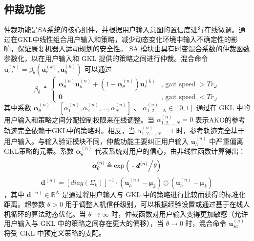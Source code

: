    \subsection{仲裁功能  }    仲裁功能是SA系统的核心组件，并根据用户输入意图的置信度进行在线微调。通过在GKL中线性组合用户输入和策略，减少动态变化环境中输入不确定性的影响，保证康复机器人运动规划的安全性。 SA 模块由具有时变混合系数的仲裁函数参数化，以在用户输入和 GKL 提供的策略之间进行仲裁。混合命令    ${\pmb{u}}_{sa}^{(n)} = {\beta _\theta }({\pmb{u}}_r^{(k)},{\pmb{u}}_h^{(n)})$    可以通过
    \begin{equation}
  \label{deqn_ex15}
  {\beta _\theta } \triangleq \left \{  {\begin{array}{*{20}{c}}
    {\pmb{\alpha }_\theta ^{(n)}{\pmb{u}}_h^{(n)} + \left( {1 - {\boldsymbol{\alpha }}_\theta ^{(n)}} \right){\pmb{u}}_r^{(k)}}&{{\text{, gait speed }}\pmb{ >  }T{r_\omega }}  \\  
    \pmb{0}&{{\text{, gait speed }}\pmb{ <  }T{r_\omega }} 
  \end{array}} \right.
\end{equation}    其中系数    ${\pmb{\alpha }}_\theta ^{(n)} = [\alpha _1^{(n)},\alpha _2^{(n)},...,\alpha _N^{(n)}]$    、    $\alpha _{1,2,...,N}^{(n)} \in [0,1]$    通过在 GKL 中的用户输入和策略之间分配控制权限来在线调整。当   $\alpha _{1,2,...,N}^{(n)} = 0$   表示AKO的参考轨迹完全依赖于GKL中的策略时。相反，当    $\alpha _{1,2,...,N}^{(n)} = 1$    时，参考轨迹完全基于用户输入。与输入验证模块不同，仲裁功能主要纠正用户输入   ${\pmb{u}}_h^{(n)}$   中严重偏离GKL策略的元素。系数    ${\pmb{\alpha }}_\theta ^{(n)}$    代表系统对用户的信心，由非线性函数计算得出：
    \begin{equation}
  \label{deqn_ex16}
  {\pmb{\alpha }}_\theta ^{(n)} \triangleq {\text{exp}}\left( {{\text{ - }}{{{\pmb{d}^{(n)}}} \mathord{\left/
 {\vphantom {{{\pmb{d}^{(n)}}} \theta }} \right.
 \kern-\nulldelimiterspace} \theta }} \right)
\end{equation}   
    \begin{equation}
  \label{deqn_ex17}
  {\pmb{d}^{(n)}} = {\left[ {diag({{\Sigma _k}})} \right]^{ - 1}} \cdot \left( {\pmb{u}_h^{(n)} - {\pmb{\mu }_k}} \right) \odot \left( {\pmb{u}_h^{(n)} - {\pmb{\mu }_k}} \right)
\end{equation}   ，其中    ${\pmb{d}^{(n)}} \in {\mathbb{R}^N}$    是通过将用户输入与 GKL 中的策略进行比较而获得的标准化距离。超参数    $\theta  > 0$    用于调整人机信任级别，可以根据经验设置或通过基于在线人机循环的算法动态优化。当    $\theta  \to \infty $    时，仲裁函数对用户输入变得更加敏感（允许用户输入与 GKL 中的策略之间存在更大的偏移），当    $\theta  \to 0$    时，混合命令    ${\pmb{u}}_{sa}^{(n)}$    将受 GKL 中预定义策略的支配。  

